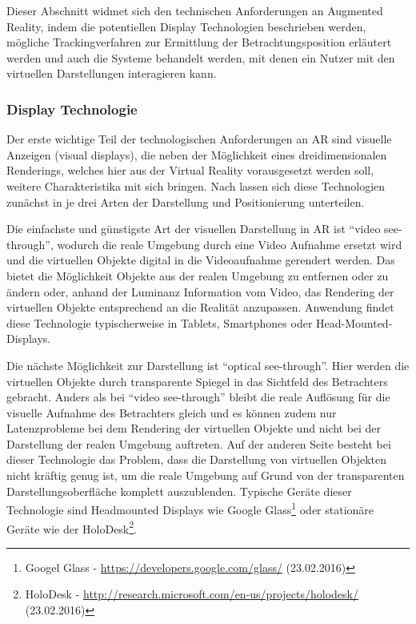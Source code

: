 Dieser Abschnitt widmet sich den technischen Anforderungen an Augmented Reality, indem die potentiellen Display Technologien beschrieben werden, mögliche Trackingverfahren zur Ermittlung der Betrachtungsposition erläutert werden und auch die Systeme behandelt werden, mit denen ein Nutzer mit den virtuellen Darstellungen interagieren kann.

\subsubsection{Display Technologie}

Der erste wichtige Teil der technologischen Anforderungen an AR sind visuelle Anzeigen (visual displays), die neben der Möglichkeit eines dreidimensionalen Renderings, welches hier aus der Virtual Reality vorausgesetzt werden soll, weitere Charakteristika mit sich bringen. Nach \citet{van2010survey} lassen sich diese Technologien zunächst in je drei Arten der Darstellung und Positionierung unterteilen.

Die einfachste und günstigste Art der visuellen Darstellung in AR ist \enquote{video see-through}, wodurch die reale Umgebung durch eine Video Aufnahme ersetzt wird und die virtuellen Objekte digital in die Videoaufnahme gerendert werden. Das bietet die Möglichkeit Objekte aus der realen Umgebung zu entfernen oder zu ändern oder, anhand der Luminanz Information vom Video, das Rendering der virtuellen Objekte entsprechend an die Realität anzupassen. Anwendung findet diese Technologie typischerweise in Tablets, Smartphones oder Head-Mounted-Displays.

Die nächste Möglichkeit zur Darstellung ist \enquote{optical see-through}. Hier werden die virtuellen Objekte durch transparente Spiegel in das Sichtfeld des Betrachters gebracht. Anders als bei \enquote{video see-through} bleibt die reale Auflösung für die visuelle Aufnahme des Betrachters gleich und es können zudem nur Latenzprobleme bei dem Rendering der virtuellen Objekte und nicht bei der Darstellung der realen Umgebung auftreten. Auf der anderen Seite besteht bei dieser Technologie das Problem, dass die Darstellung von virtuellen Objekten nicht kräftig genug ist, um die reale Umgebung auf Grund von der transparenten Darstellungsoberfläche komplett auszublenden. Typische Geräte dieser Technologie sind Headmounted Displays wie Google Glass\footnote{Googel Glass - \url{https://developers.google.com/glass/} (23.02.2016)} oder stationäre Geräte wie der HoloDesk\footnote{HoloDesk - \url{http://research.microsoft.com/en-us/projects/holodesk/} (23.02.2016)}.


